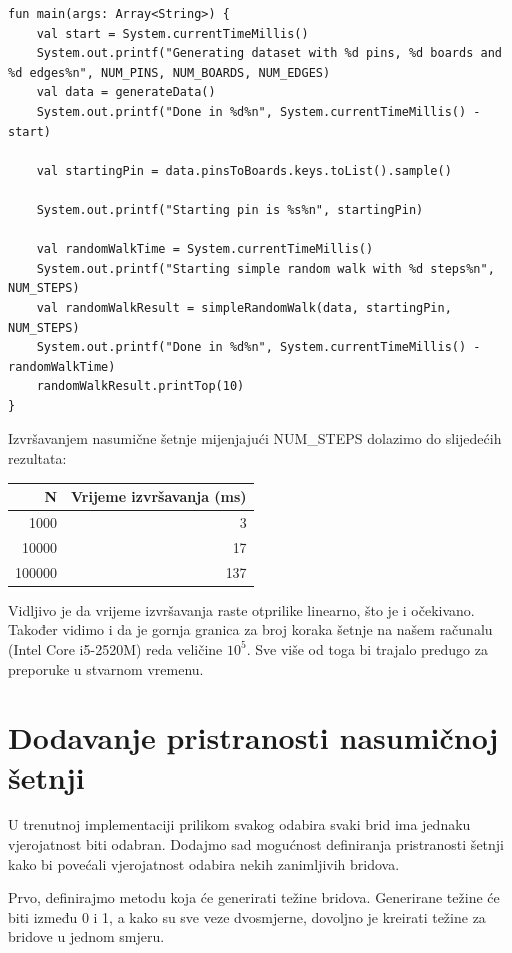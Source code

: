 \documentclass[times, utf8, seminar]{fer}
\begin{document}
\begin{lstlisting}
fun main(args: Array<String>) {
    val start = System.currentTimeMillis()
    System.out.printf("Generating dataset with %d pins, %d boards and %d edges%n", NUM_PINS, NUM_BOARDS, NUM_EDGES)
    val data = generateData()
    System.out.printf("Done in %d%n", System.currentTimeMillis() - start)

    val startingPin = data.pinsToBoards.keys.toList().sample()

    System.out.printf("Starting pin is %s%n", startingPin)

    val randomWalkTime = System.currentTimeMillis()
    System.out.printf("Starting simple random walk with %d steps%n", NUM_STEPS)
    val randomWalkResult = simpleRandomWalk(data, startingPin, NUM_STEPS)
    System.out.printf("Done in %d%n", System.currentTimeMillis() - randomWalkTime)
    randomWalkResult.printTop(10)
}
\end{lstlisting}

Izvršavanjem nasumične šetnje mijenjajući NUM\_STEPS dolazimo do slijedećih rezultata:

\begin{center}
		  \begin{tabular}{ |r|r| }
					 \hline
					 N & Vrijeme izvršavanja (ms) \\
					 \hline
					 1000 & 3 \\
					 \hline
					 10000 & 17 \\
					 \hline
					 100000 & 137 \\
					 \hline
		  \end{tabular}
\end{center}

Vidljivo je da vrijeme izvršavanja raste otprilike linearno, što je i očekivano. Također vidimo i da je gornja granica za broj koraka šetnje na našem računalu (Intel Core i5-2520M) reda veličine $10^5$. Sve više od toga bi trajalo predugo za preporuke u stvarnom vremenu. 

\section{Dodavanje pristranosti nasumičnoj šetnji}

U trenutnoj implementaciji prilikom svakog odabira svaki brid ima jednaku vjerojatnost biti odabran. Dodajmo sad mogućnost definiranja pristranosti šetnji kako bi povećali vjerojatnost odabira nekih zanimljivih bridova.

Prvo, definirajmo metodu koja će generirati težine bridova. Generirane težine će biti između 0 i 1, a kako su sve veze dvosmjerne, dovoljno je kreirati težine za bridove u jednom smjeru.
\end{document}
